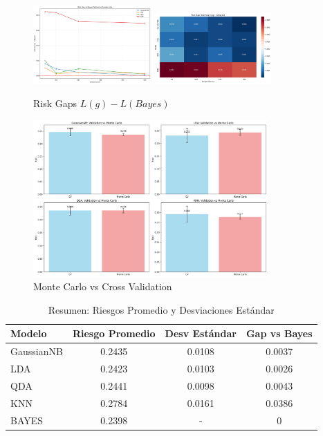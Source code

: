 \documentclass[10pt]{article}
\begin{document}
\newpage

\begin{figure}[!ht]
    \centering
    \includegraphics[width=0.4\textwidth]{./Parte 2/figures/risk_gaps.png}
    \includegraphics[width=0.4\textwidth]{./Parte 2/figures/risk_gap_heatmap.png}
    \caption{Risk Gaps $L(g) - L(Bayes)$}
    \label{fig:risk-gaps-images}
\end{figure}

\begin{figure}[!ht]
    \centering
    \includegraphics[width=0.8\textwidth]{./Parte 2/figures/validation_comparison.png}
    \caption{Monte Carlo vs Cross Validation}
    \label{fig:mc-vs-cv}
\end{figure}

\begin{table}[!ht]
    \centering
    \caption{Resumen: Riesgos Promedio y Desviaciones Estándar}
    \label{tab:riesgos_promedio}
    \begin{tabular}{lccc}
        \hline
        \textbf{Modelo} & \textbf{Riesgo Promedio} & \textbf{Desv Estándar} & \textbf{Gap vs Bayes} \\
        \hline
        GaussianNB & 0.2435 & 0.0108 & 0.0037 \\
        LDA & 0.2423 & 0.0103 & 0.0026 \\
        QDA & 0.2441 & 0.0098 & 0.0043 \\
        KNN & 0.2784 & 0.0161 & 0.0386 \\
        \hline
        BAYES & 0.2398 & - & 0 \\
        \hline
    \end{tabular}
\end{table}
\end{document}
